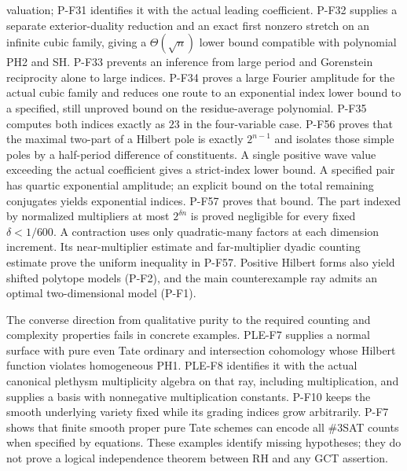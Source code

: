 valuation; P-F31 identifies it with the actual leading coefficient.
P-F32 supplies a separate exterior-duality reduction and an exact
first nonzero stretch on an infinite cubic family, giving a
$\Theta(\sqrt n)$ lower bound compatible with polynomial PH2 and SH.
P-F33 prevents an inference from large period and Gorenstein
reciprocity alone to large indices. P-F34 proves a large Fourier
amplitude for the actual cubic family and reduces one route to
an exponential index lower bound to a specified, still unproved
bound on the residue-average polynomial. P-F35 computes both
indices exactly as $23$ in the four-variable case.
P-F56 proves that the maximal two-part of a Hilbert pole is exactly
$2^{n-1}$ and isolates those simple poles by a half-period difference
of constituents. A single positive wave value exceeding the actual
coefficient gives a strict-index lower bound. A specified pair has
quartic exponential amplitude; an explicit bound on the total remaining
conjugates yields exponential indices. P-F57 proves that bound.
The part indexed by normalized multipliers at most $2^{\delta n}$
is proved negligible for every fixed $\delta<1/600$.
A contraction uses only quadratic-many factors at each dimension
increment. Its near-multiplier estimate and far-multiplier
dyadic counting estimate prove the uniform inequality in P-F57.
Positive Hilbert forms also yield
shifted polytope models (P-F2), and the main counterexample ray admits
an optimal two-dimensional model (P-F1).

The converse direction from qualitative purity to the required counting
and complexity properties fails in concrete examples. PLE-F7 supplies a
normal surface with pure even Tate ordinary and intersection cohomology
whose Hilbert function violates homogeneous PH1. PLE-F8 identifies it
with the actual canonical plethysm multiplicity algebra on that ray,
including multiplication, and supplies a basis with nonnegative
multiplication constants. P-F10 keeps the smooth
underlying variety fixed while its grading indices grow arbitrarily.
P-F7 shows that finite smooth proper pure Tate schemes can encode all
\#3SAT counts when specified by equations. These examples identify
missing hypotheses; they do not prove a logical independence theorem
between RH and any GCT assertion.

